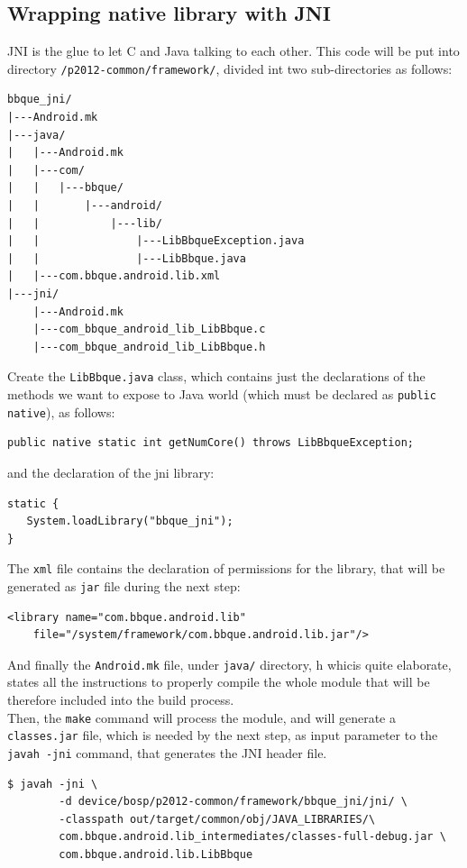 \subsection{Wrapping native library with JNI}
JNI is the glue to let C and Java talking to each other. This code will be put into directory \texttt{/p2012-common/framework/}, divided int two sub-directories as follows:
\begin{verbatim}
bbque_jni/
|---Android.mk
|---java/
|   |---Android.mk
|   |---com/
|   |   |---bbque/
|   |       |---android/
|   |           |---lib/
|   |               |---LibBbqueException.java
|   |               |---LibBbque.java
|   |---com.bbque.android.lib.xml
|---jni/
    |---Android.mk
    |---com_bbque_android_lib_LibBbque.c
    |---com_bbque_android_lib_LibBbque.h
\end{verbatim}
Create the \texttt{LibBbque.java} class, which contains just the declarations of the methods we want to expose to Java world (which must be declared as \texttt{public native}), as follows:
\begin{verbatim}
public native static int getNumCore() throws LibBbqueException;
\end{verbatim}
and the declaration of the jni library:
\begin{verbatim}
static {
   System.loadLibrary("bbque_jni");
}
\end{verbatim}
The \texttt{xml} file contains the declaration of permissions for the library, that will be generated as \texttt{jar} file during the next step:
\begin{verbatim}
<library name="com.bbque.android.lib"
    file="/system/framework/com.bbque.android.lib.jar"/>
\end{verbatim}
And finally the \texttt{Android.mk} file, under \texttt{java/} directory, h whicis quite elaborate, states all the instructions to properly compile the whole module that will be therefore included into the build process.\\
Then, the \texttt{make} command will process the module, and will generate a \texttt{classes.jar} file, which is needed by the next step, as input parameter to the \texttt{javah -jni} command, that generates the JNI header file.
\begin{verbatim}
$ javah -jni \
        -d device/bosp/p2012-common/framework/bbque_jni/jni/ \
        -classpath out/target/common/obj/JAVA_LIBRARIES/\ 
        com.bbque.android.lib_intermediates/classes-full-debug.jar \
        com.bbque.android.lib.LibBbque
\end{verbatim}
